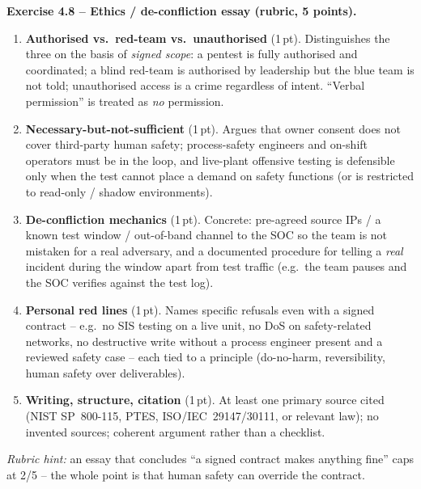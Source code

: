 \documentclass[11pt,a4paper]{article}
\begin{document}
\begin{solutionbox}
\textbf{Exercise 4.8 -- Ethics / de-confliction essay (rubric, 5 points).}\\[2pt]
\begin{enumerate}\setlength{\itemsep}{0pt}
  \item \textbf{Authorised vs.\ red-team vs.\ unauthorised} (1\,pt). Distinguishes the three on the
        basis of \emph{signed scope}: a pentest is fully authorised and coordinated; a blind
        red-team is authorised by leadership but the blue team is not told; unauthorised access is a
        crime regardless of intent. ``Verbal permission'' is treated as \emph{no} permission.
  \item \textbf{Necessary-but-not-sufficient} (1\,pt). Argues that owner consent does not cover
        third-party human safety; process-safety engineers and on-shift operators must be in the
        loop, and live-plant offensive testing is defensible only when the test cannot place a demand
        on safety functions (or is restricted to read-only / shadow environments).
  \item \textbf{De-confliction mechanics} (1\,pt). Concrete: pre-agreed source IPs / a known test
        window / out-of-band channel to the SOC so the team is not mistaken for a real adversary, and
        a documented procedure for telling a \emph{real} incident during the window apart from test
        traffic (e.g.\ the team pauses and the SOC verifies against the test log).
  \item \textbf{Personal red lines} (1\,pt). Names specific refusals even with a signed contract --
        e.g.\ no SIS testing on a live unit, no DoS on safety-related networks, no destructive write
        without a process engineer present and a reviewed safety case -- each tied to a principle
        (do-no-harm, reversibility, human safety over deliverables).
  \item \textbf{Writing, structure, citation} (1\,pt). At least one primary source cited (NIST
        SP~800-115, PTES, ISO/IEC~29147/30111, or relevant law); no invented sources; coherent
        argument rather than a checklist.
\end{enumerate}
\emph{Rubric hint:} an essay that concludes ``a signed contract makes anything fine'' caps at 2/5 --
the whole point is that human safety can override the contract.
\end{solutionbox}
\end{document}
